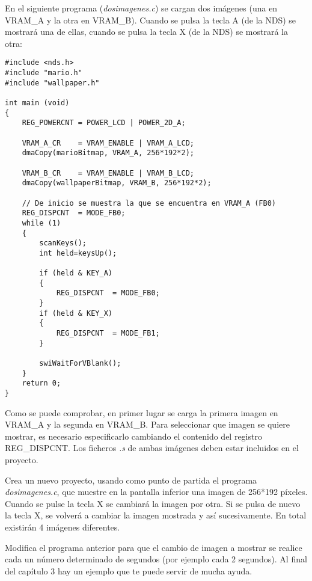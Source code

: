 \begin{example}
En el siguiente programa (\textit{dosimagenes.c}) se cargan dos imágenes (una en VRAM\_A y la otra en VRAM\_B). Cuando se pulsa la tecla A (de la NDS) se mostrará una de ellas, cuando se pulsa la tecla X (de la NDS) se mostrará la otra:

\begin{lstlisting}
#include <nds.h>
#include "mario.h"
#include "wallpaper.h"

int main (void)
{
	REG_POWERCNT = POWER_LCD | POWER_2D_A;
	
	VRAM_A_CR    = VRAM_ENABLE | VRAM_A_LCD;
	dmaCopy(marioBitmap, VRAM_A, 256*192*2);
	
	VRAM_B_CR    = VRAM_ENABLE | VRAM_B_LCD;
	dmaCopy(wallpaperBitmap, VRAM_B, 256*192*2);
	
	// De inicio se muestra la que se encuentra en VRAM_A (FB0)
	REG_DISPCNT  = MODE_FB0;
	while (1)
	{
		scanKeys();
		int held=keysUp();
		
		if (held & KEY_A)
		{
			REG_DISPCNT  = MODE_FB0;
		}
		if (held & KEY_X)
		{
			REG_DISPCNT  = MODE_FB1;
		}
		
		swiWaitForVBlank();
	}
	return 0;
}
\end{lstlisting}
\end{example}

Como se puede comprobar, en primer lugar se carga la primera imagen en VRAM\_A y la segunda en VRAM\_B. Para seleccionar que imagen se quiere mostrar, es necesario especificarlo cambiando el contenido del registro REG\_DISPCNT. Los ficheros \textit{.s} de ambas imágenes deben estar incluidos en el proyecto.

\begin{exercise}
Crea un nuevo proyecto, usando como punto de partida el programa \textit{dosimagenes.c}, que muestre en la pantalla inferior una imagen de 256*192 píxeles. Cuando se pulse la tecla X se cambiará la imagen por otra. Si se pulsa de nuevo la tecla X, se volverá a cambiar la imagen mostrada y así sucesivamente. En total existirán 4 imágenes diferentes.
\end{exercise}

\begin{exercise}
Modifica el programa anterior para que el cambio de imagen a mostrar se realice cada un número determinado de segundos (por ejemplo cada 2 segundos). Al final del capítulo 3 hay un ejemplo que te puede servir de mucha ayuda.
\end{exercise}
	

